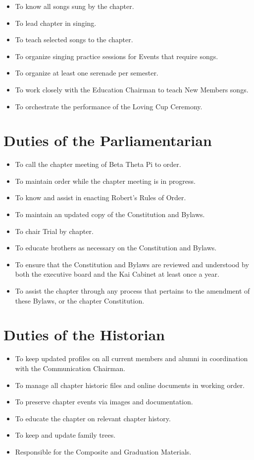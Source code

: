 \begin{itemize}

\item To know all songs sung by the chapter.
\item To lead chapter in singing.
\item To teach selected songs to the chapter.
\item To organize singing practice sessions for Events that require songs.
\item To organize at least one serenade per semester.
\item To work closely with the Education Chairman to teach New Members songs.
\item To orchestrate the performance of the Loving Cup Ceremony.
\end{itemize}

\section{Duties of the Parliamentarian}
\label{sec:duties-of-the-parliamentarian}

\begin{itemize}

\item To call the chapter meeting of Beta Theta Pi to order.
\item To maintain order while the chapter meeting is in progress.
\item To know and assist in enacting Robert’s Rules of Order.
\item To maintain an updated copy of the Constitution and Bylaws.
\item To chair Trial by chapter.
\item To educate brothers as necessary on the Constitution and Bylaws.
\item To ensure that the Constitution and Bylaws are reviewed and understood by
both the executive board and the Kai Cabinet at least once a year.
\item To assist the chapter through any process that pertains to the amendment
of these Bylaws, or the chapter Constitution.
\end{itemize}

\section{Duties of the Historian}
\label{sec:duties-of-the-historian}

\begin{itemize}

\item To keep updated profiles on all current members and alumni in
coordination with the Communication Chairman.
\item To manage all chapter historic files and online documents in working
order.
\item To preserve chapter events via images and documentation.
\item To educate the chapter on relevant chapter history.
\item To keep and update family trees.
\item Responsible for the Composite and Graduation Materials.
\end{itemize}
